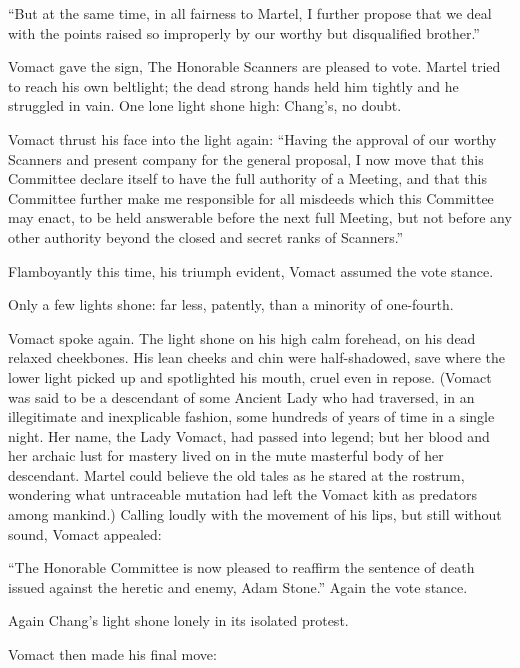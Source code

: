 ``But at the same time, in all fairness to Martel, I further propose that we deal with the points raised so improperly by our worthy but disqualified brother.''

Vomact gave the sign, The Honorable Scanners are pleased to vote. Martel tried to reach his own beltlight; the dead strong hands held him tightly and he struggled in vain. One lone light shone high: Chang's, no doubt.

Vomact thrust his face into the light again: ``Having the approval of our worthy Scanners and present company for the general proposal, I now move that this Committee declare itself to have the full authority of a Meeting, and that this Committee further make me responsible for all misdeeds which this Committee may enact, to be held answerable before the next full Meeting, but not before any other authority beyond the closed and secret ranks of Scanners.''

Flamboyantly this time, his triumph evident, Vomact assumed the vote stance.

Only a few lights shone: far less, patently, than a minority of one-fourth.

Vomact spoke again. The light shone on his high calm forehead, on his dead relaxed cheekbones. His lean cheeks and chin were half-shadowed, save where the lower light picked up and spotlighted his mouth, cruel even in repose. (Vomact was said to be a descendant of some Ancient Lady who had traversed, in an illegitimate and inexplicable fashion, some hundreds of years of time in a single night. Her name, the Lady Vomact, had passed into legend; but her blood and her archaic lust for mastery lived on in the mute masterful body of her descendant. Martel could believe the old tales as he stared at the rostrum, wondering what untraceable mutation had left the Vomact kith as predators among mankind.) Calling loudly with the movement of his lips, but still without sound, Vomact appealed:

``The Honorable Committee is now pleased to reaffirm the sentence of death issued against the heretic and enemy, Adam Stone.'' Again the vote stance.

Again Chang's light shone lonely in its isolated protest.

Vomact then made his final move:

